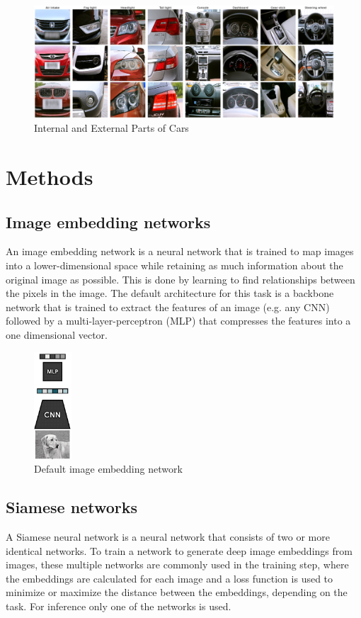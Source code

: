 \documentclass[12pt,a4paper]{report}
\begin{document}
\begin{figure}[h]
    \centering
    \includegraphics[width=\textwidth]{./images/carparst.png}
	\caption{Internal and External Parts of Cars}
\end{figure}


\newpage


\chapter{Methods}
\section{Image embedding networks}


An image embedding network is a neural network that is trained to map images into a lower-dimensional space while retaining as much information about the original image as possible.
This is done by learning to find relationships between the pixels in the image.
The default architecture for this task is a backbone network that is trained to extract the features of an image (e.g. any CNN) followed by a multi-layer-perceptron (MLP) that compresses the features into a one dimensional vector.  

\begin{figure}[h]
    \centering
	\includegraphics[height=4cm]{./images/embedding_network.png}
	\caption{Default image embedding network}
\end{figure}

\newpage

\section{Siamese networks}
A Siamese neural network is a neural network that consists of two or more identical networks.\cite{signatureVerification}
To train a network to generate deep image embeddings from images, these multiple networks are commonly used in the training step,
where the embeddings are calculated for each image and a loss function is used to minimize or maximize the distance between the embeddings,
depending on the task. For inference only one of the networks is used.
\end{document}
